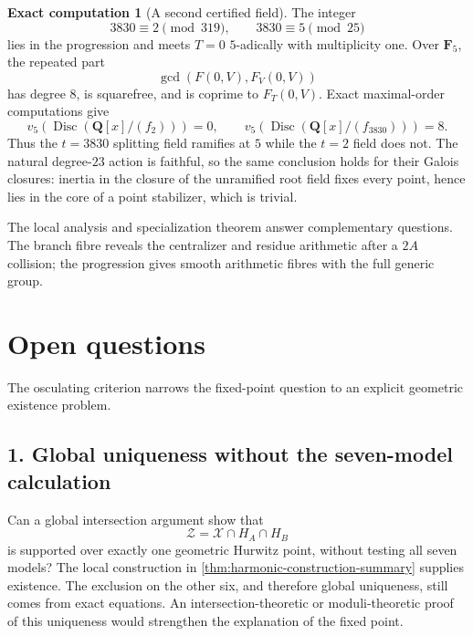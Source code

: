 \documentclass[11pt]{amsart}
\theoremstyle{definition}
\newtheorem{computation}[computation]{Exact computation}
\theoremstyle{remark}
\newcommand{\QQ}{\mathbf Q}
\newcommand{\FF}{\mathbf F}
\begin{document}
\smallskip
\begin{computation}[A second certified field]\label{comp:t3830}
The integer
\[
 3830\equiv2\pmod{319},\qquad 3830\equiv5\pmod{25}
\]
lies in the progression and meets $T=0$ $5$-adically with multiplicity one.
Over $\FF_5$, the repeated part
\[
 \gcd(F(0,V),F_V(0,V))
\]
has degree $8$, is squarefree, and is coprime to $F_T(0,V)$.  Exact
maximal-order computations give
\[
 v_5(\operatorname{Disc}(\QQ[x]/(f_2)))=0,
 \qquad
 v_5(\operatorname{Disc}(\QQ[x]/(f_{3830})))=8.
\]
Thus the $t=3830$ splitting field ramifies at $5$ while the $t=2$ field does
not.  The natural degree-$23$ action is faithful, so the same conclusion
holds for their Galois closures: inertia in the closure of the unramified
root field fixes every point, hence lies in the core of a point stabilizer,
which is trivial.
\end{computation}

The local analysis and specialization theorem answer complementary
questions.  The branch fibre reveals the centralizer and residue arithmetic
after a $2A$ collision; the progression gives smooth arithmetic fibres with
the full generic group.

\section{Open questions}
\label{sec:open}

The osculating criterion narrows the fixed-point question to an explicit
geometric existence problem.

\subsection*{1. Global uniqueness without the seven-model calculation}
Can a global intersection argument show that
\[
 \mathcal Z=\mathcal X\cap H_A\cap H_B
\]
is supported over exactly one geometric Hurwitz point, without testing
all seven models?  The local construction in
\cref{thm:harmonic-construction-summary} supplies existence.
The exclusion on the other six, and therefore global uniqueness,
still comes from exact equations.  An intersection-theoretic or
moduli-theoretic proof of this uniqueness would strengthen the
explanation of the fixed point.
\end{document}
